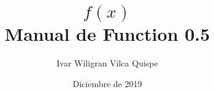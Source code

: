 \documentclass[openany]{book}
\newcommand{\fx}{$f(x)$}
\begin{document}
   \title{\Huge \fx\\Manual de Function 0.5}
   \author{Ivar Wiligran Vilca Quispe}
   \date{Diciembre de 2019}
   \maketitle
   
   \tableofcontents
   
   \titlespacing{\chapter}{0pt}{10pt}{20pt}
   
   \titlespacing{\section}{0pt}{10pt}{10pt}
   
   
   
   
   
   
   
   
   
   
   
   
   
   
   
   
   
   
   
   
   
   \begin{thebibliography}{99}
   \end{thebibliography}
\end{document}
